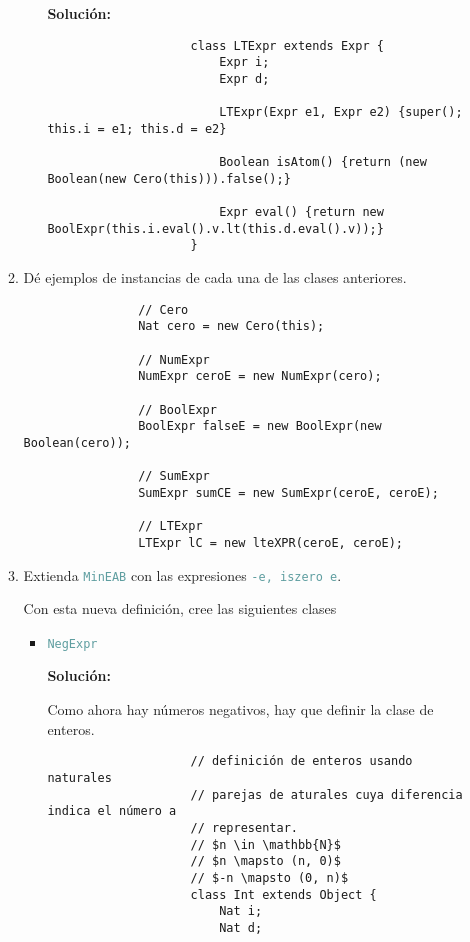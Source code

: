 \documentclass{article}
\newcommand{\tx}[1]{\textcolor{CadetBlue} {\texttt{#1}}}
\newcommand{\tb}[1]{\textcolor{RoyalPurple} {\textbf{#1}}}
\begin{document}
\begin{enumerate}
\begin{enumerate}
\begin{itemize}
                \tb{Solución:}

                \begin{verbatim}
                    class LTExpr extends Expr {
                        Expr i;
                        Expr d;

                        LTExpr(Expr e1, Expr e2) {super(); this.i = e1; this.d = e2}

                        Boolean isAtom() {return (new Boolean(new Cero(this))).false();}

                        Expr eval() {return new BoolExpr(this.i.eval().v.lt(this.d.eval().v));}
                    }
                \end{verbatim}

            \end{itemize}

            \item Dé ejemplos de instancias de cada una de las clases 
            anteriores.

            \begin{verbatim}
                // Cero
                Nat cero = new Cero(this);

                // NumExpr
                NumExpr ceroE = new NumExpr(cero);

                // BoolExpr
                BoolExpr falseE = new BoolExpr(new Boolean(cero));

                // SumExpr
                SumExpr sumCE = new SumExpr(ceroE, ceroE);

                // LTExpr
                LTExpr lC = new lteXPR(ceroE, ceroE);
            \end{verbatim}

            \item Extienda \tx{MinEAB} con las expresiones \tx{-e, iszero e}.

            Con esta nueva definición, cree las siguientes clases
            
            \begin{itemize}
                \item \tx{NegExpr}

                \tb{Solución:}

                Como ahora hay números negativos, hay que definir la clase de
                enteros.

                \begin{verbatim}
                    // definición de enteros usando naturales
                    // parejas de aturales cuya diferencia indica el número a 
                    // representar.
                    // $n \in \mathbb{N}$
                    // $n \mapsto (n, 0)$
                    // $-n \mapsto (0, n)$
                    class Int extends Object {
                        Nat i;
                        Nat d;


\end{verbatim}
\end{itemize}
\end{enumerate}
\end{enumerate}
\end{document}
